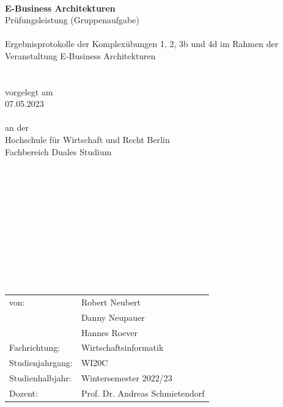 \documentclass[notitlepage, hidelinks]{article}
\begin{document}
\mbox{}\\ \mbox{}\\\mbox{}\\ \mbox{}\\\mbox{}\\ \mbox{}\\\mbox{}\\\mbox{}\\
\mbox{}\\\mbox{}\\\mbox{}\\\mbox{}\\\mbox{}\\\mbox{}\\\mbox{}\\\mbox{}\\
\begin{center}
\huge
\textbf{E-Business Architekturen} \\ 
\LARGE
Prüfungsleistung (Gruppenaufgabe) \\
\mbox{}\\
\large
Ergebnisprotokolle der Komplexübungen 1, 2, 3b und 4d im Rahmen der Veranstaltung E-Business Architekturen  \\

\mbox{}\\ \mbox{}\\
\large
vorgelegt am \\
07.05.2023 \\
\mbox{}\\
an der \\
Hochschule für Wirtschaft und Recht Berlin \\
Fachbereich Duales Studium \\
\end{center}

\mbox{}\\ \mbox{}\\\mbox{}\\ \mbox{}\\\mbox{}\\ \mbox{}\\\mbox{}\\ \mbox{}\\\mbox{}\\ \mbox{}\\
\begin{table}[H]
\begin{tabular}{ l l }
von: 
& Robert Neubert \\
& Danny Neupauer \\
& Hannes Roever \\
Fachrichtung: & Wirtschaftsinformatik \\
Studienjahrgang: & WI20C \\
Studienhalbjahr:& Wintersemester 2022/23 \\
Dozent: & Prof. Dr. Andreas Schmietendorf \\
\end{tabular}
\end{table}
\end{document}
